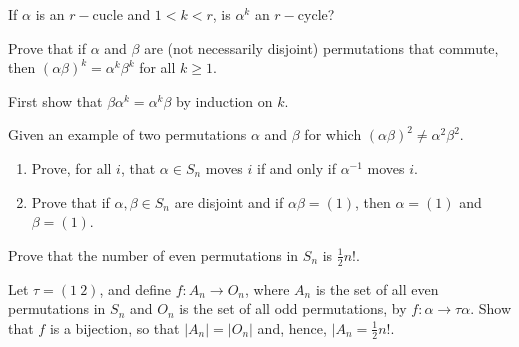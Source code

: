 \documentclass[12pt]{article}
\newenvironment{exercise}[2][Exercise]{\begin{trivlist}
\item[\hskip \labelsep {\bfseries #1}\hskip \labelsep {\bfseries #2.}]}
{\end{trivlist}}
\newenvironment{hint}[2][Hint]{\begin{trivlist}
    \item[\hskip \labelsep {\bfseries #1}\hskip \labelsep {\bfseries #2.}]}
    {\end{trivlist}}
\begin{document}
\begin{exercise}{1.19}
    If $\alpha$ is an $r-$cucle and $1<k<r$, is $\alpha^k$ an $r-$cycle?
\end{exercise}

\begin{exercise}{1.20}
    \begin{enumerate}
        \item[(i)] Prove that if $\alpha$ and $\beta$ are (not necessarily disjoint) permutations that commute, then $(\alpha\beta)^k=\alpha^k\beta^k$ for all $k\geq1$.
        \begin{hint}{}
            First show that $\beta\alpha^k = \alpha^k \beta$ by induction on $k$.
        \end{hint}
        \item[(ii)] Given an example of two permutations $\alpha$ and $\beta$ for which $(\alpha\beta)^2\neq \alpha^2\beta^2$.
    \end{enumerate}
\end{exercise}

\begin{exercise}{1.21}
    \begin{enumerate}
        \item[(i)] Prove, for all $i$, that $\alpha \in S_n$ moves $i$ if and only if $\alpha^{-1}$ moves $i$.
        \item[(ii)] Prove that if $\alpha,\beta \in S_n$ are disjoint and if $\alpha\beta=(1)$, then $\alpha=(1)$ and $\beta=(1)$.
    \end{enumerate}
    
\end{exercise}


\begin{exercise}{1.22}
    Prove that the number of even permutations in $S_n$ is $\frac{1}2 n!$.
    \begin{hint}{}
        Let $\tau=(1\:2)$, and define $f: A_n\rightarrow O_n$, where $A_n$ is the set of all even permutations in $S_n$ and $O_n$ is the set of all odd permutations, by $f:\alpha \rightarrow \tau\alpha$. Show that $f$ is a bijection, so that $|A_n|=|O_n|$ and, hence, $|A_n=\frac{1}2 n!$.
    \end{hint}
\end{exercise}
\end{document}
